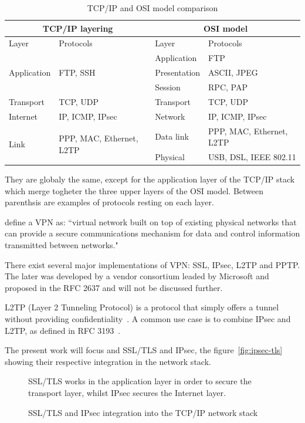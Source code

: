 \begin{table}[ht]
\center
\begin{tabularx}{\textwidth}{|l|l|l|X|} \hline
\multicolumn{2}{|c|}{TCP/IP layering} & \multicolumn{2}{c|}{OSI model} \\ \hline
Layer & Protocols & Layer & Protocols \\ \hline
\multirow{3}{*}{Application} & \multirow{3}{*}{FTP, SSH} & Application & FTP \\ \cline{3-4}
 & & Presentation & ASCII, JPEG \\ \cline{3-4}
 & & Session & RPC, PAP \\ \hline
Transport & TCP, UDP & Transport & TCP, UDP \\ \hline
Internet & IP, ICMP, IPsec & Network & IP, ICMP, IPsec \\ \hline
\multirow{2}{*}{Link} & \multirow{2}{*}{PPP, MAC, Ethernet, L2TP} & Data link & PPP, MAC, Ethernet, L2TP \\ \cline{3-4}
 & & Physical & USB, DSL, IEEE 802.11 \\ \hline
\end{tabularx}
\caption{TCP/IP and OSI model comparison}{They are globaly the same, except for the application layer of the TCP/IP stack which merge togheter the three upper layers of the OSI model. Between parenthsis are examples of protocols resting on each layer.}
\label{tab:tcp-ip-stack}
\end{table}


\citet{Frankel:2005:SGI:2206289} define a VPN as: ``virtual network built on top of existing physical networks that can provide a
secure communications mechanism for data and control information transmitted between networks."

There exist several major implementations of VPN: SSL, IPsec, L2TP and PPTP.
The later was developed by a vendor consortium leaded by Microsoft and proposed in the RFC 2637 and will not be discussed further.

\noindent L2TP (Layer 2 Tunneling Protocol) is a protocol that simply offers a tunnel without providing confidentiality~\cite{rfc3931}.
A common use case is to combine IPsec and L2TP, as defined in RFC 3193~\cite{rfc3193}.\newline{}

The present work will focus and SSL/TLS and IPsec, the figure~\ref{fig:ipsec-tls} showing their respective integration in the network stack.

\begin{figure}[ht]
\center

\caption{SSL/TLS and IPsec integration into the TCP/IP network stack}{SSL/TLS works in the application layer in order to secure the transport layer, whilst IPsec secures the Internet layer.}
\label{fig:tls-ipsec}
\end{figure}

